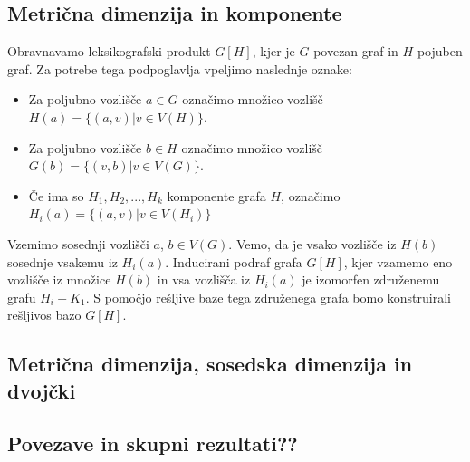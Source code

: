 \documentclass[mat1, tisk]{fmfdelo}
\begin{document}
\subsection{Metrična dimenzija in komponente}
Obravnavamo leksikografski produkt $G[H]$, kjer je $G$ povezan graf in $H$ pojuben graf.
Za potrebe tega podpoglavlja vpeljimo naslednje oznake:
\begin{itemize}
    \item Za poljubno vozlišče $a \in G$ označimo množico vozlišč 
    $H(a) = \{ (a, v) | v \in V(H) \}$.
    \item Za poljubno vozlišče $b \in H$ označimo množico vozlišč 
    $G(b) = \{ (v, b) | v \in V(G) \}$.
    \item Če ima so $H_1, H_2, ..., H_k$ komponente grafa $H$, označimo 
    $H_i(a) = \{ (a, v) | v \in V(H_i) \}$
\end{itemize}

Vzemimo sosednji vozlišči $a$, $b \in V(G)$. Vemo, da je vsako vozlišče iz $H(b)$ sosednje vsakemu
iz $H_i(a).$ 
Inducirani podraf grafa $G[H]$, kjer vzamemo eno vozlišče iz množice $H(b)$ in vsa vozlišča iz
$H_i(a)$ je izomorfen združenemu grafu $H_i + K_1.$
S pomočjo rešljive baze tega združenega grafa bomo konstruirali rešljivos bazo $G[H]$.


\subsection{Metrična dimenzija, sosedska dimenzija in dvojčki}

\subsection{Povezave in skupni rezultati??}



\end{document}
